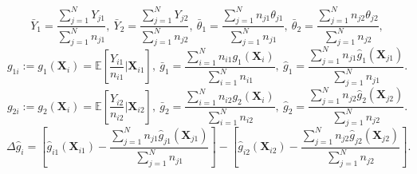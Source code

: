 \documentclass[12pt,letterpaper]{article}
\begin{document}
$$\bar{Y}_1=\frac{\sum_{j=1}^NY_{j1}}{\sum_{j=1}^Nn_{j1}},\ \bar{Y}_2=\frac{\sum_{j=1}^NY_{j2}}{\sum_{j=1}^Nn_{j2}}, \ \bar{\theta}_1=\frac{\sum_{j=1}^Nn_{j1}\theta_{j1}}{\sum_{j=1}^Nn_{j1}},\ \bar{\theta}_2=\frac{\sum_{j=1}^Nn_{j2}\theta_{j2}}{\sum_{j=1}^Nn_{j2}},$$
$$g_{1i}:=g_1(\mathbf{X}_i)=\mathbb{E}\left[\frac{Y_{i1}}{n_{i1}}\bigg|\mathbf{X}_{i1}\right],\ \bar{g}_1=\frac{\sum_{i=1}^Nn_{i1}g_1(\mathbf{X}_i)}{\sum_{i=1}^Nn_{i1}},\ \hat{g}_1=\frac{\sum_{j=1}^Nn_{j1}\hat{g}_{1}(\mathbf{X}_{j1})}{\sum_{j=1}^Nn_{j1}}.$$
$$g_{2i}:=g_2(\mathbf{X}_i)=\mathbb{E}\left[\frac{Y_{i2}}{n_{i2}}\bigg|\mathbf{X}_{i2}\right],\ \bar{g}_2=\frac{\sum_{i=1}^Nn_{i2}g_2(\mathbf{X}_i)}{\sum_{i=1}^Nn_{i2}},\ \hat{g}_2=\frac{\sum_{j=1}^Nn_{j2}\hat{g}_{2}(\mathbf{X}_{j2})}{\sum_{j=1}^Nn_{j2}}.$$
$$\Delta\hat{g}_i=\left[\hat{g}_{i1}(\mathbf{X}_{i1})-\frac{\sum_{j=1}^Nn_{j1}\hat{g}_{j1}(\mathbf{X}_{j1})}{\sum_{j=1}^Nn_{j1}}\right]-\left[\hat{g}_{i2}(\mathbf{X}_{i2})-\frac{\sum_{j=1}^Nn_{j2}\hat{g}_{j2}(\mathbf{X}_{j2})}{\sum_{j=1}^Nn_{j2}}\right].$$
\end{document}

